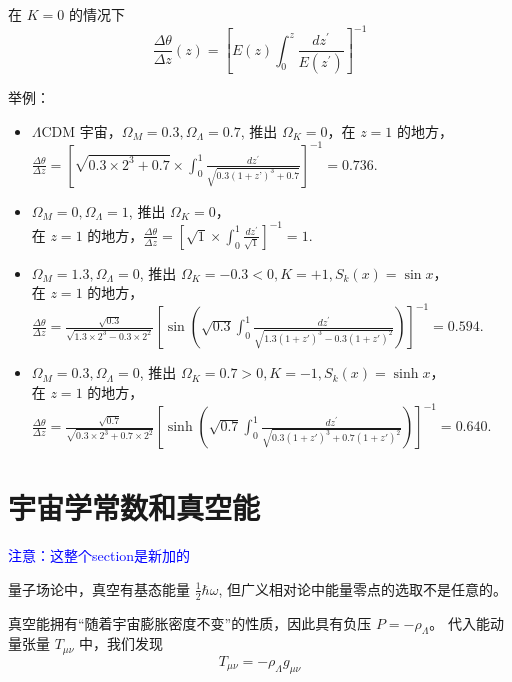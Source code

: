 \documentclass[12pt]{ctexart}
\newcommand{\new}[1]{\textcolor{blue}{#1}}
\begin{document}
在 $K=0$ 的情况下 
\begin{equation}
    \frac{\Delta \theta}{\Delta z}(z)= \left[E(z) \int_{0}^{z} \frac{d z^{\prime}}{E\left(z^{\prime}\right)}\right]^{-1}
\end{equation}

举例：
\begin{itemize}
    \item $\Lambda$CDM 宇宙，$\Omega_M=0.3,\Omega_\Lambda=0.7$, 推出 $\Omega_K=0$，在 $z=1$ 的地方，$\frac{\Delta \theta}{\Delta z}=\left[\sqrt{0.3 \times 2^{3}+0.7} \times \int_{0}^{1} \frac{d z^{\prime}}{\sqrt{0.3\left(1+z’\right)^{3}+0.7}}\right]^{-1}=0.736.$ 
    \item $\Omega_M=0, \Omega_\Lambda=1$, 推出 $\Omega_K=0$，\\ 在 $z=1$ 的地方，$\frac{\Delta \theta}{\Delta z}=\left[\sqrt{1} \times \int_{0}^{1} \frac{d z^{\prime}}{\sqrt{1}}\right]^{-1}=1.$ 
    \item $\Omega_M=1.3, \Omega_\Lambda=0$, 推出 $\Omega_K=-0.3<0, K=+1, S_k(x)=\sin x$，\\ 在 $z=1$ 的地方，\\$\frac{\Delta \theta}{\Delta z}=\frac{\sqrt{0.3}}{\sqrt{1.3\times 2^3-0.3\times 2^2}}\left[\sin(\sqrt{0.3}  \int_{0}^{1} \frac{d z^{\prime}}{\sqrt{1.3(1+z')^3 - 0.3 (1+z')^2}})\right]^{-1}=0.594.$  
    \item $\Omega_M=0.3, \Omega_\Lambda=0$, 推出 $\Omega_K=0.7>0, K=-1, S_k(x)=\sinh x$，\\ 在 $z=1$ 的地方，\\ $\frac{\Delta \theta}{\Delta z}=\frac{\sqrt{0.7}}{\sqrt{0.3\times 2^3 + 0.7\times 2^2}}\left[\sinh(\sqrt{0.7}  \int_{0}^{1} \frac{d z^{\prime}}{\sqrt{0.3(1+z')^3 + 0.7 (1+z')^2}})\right]^{-1}=0.640.$  
\end{itemize}


\section{宇宙学常数和真空能}

\new{注意：这整个section是新加的}

量子场论中，真空有基态能量 $\frac{1}{2}\hbar \omega$, 但广义相对论中能量零点的选取不是任意的。 

真空能拥有“随着宇宙膨胀密度不变”的性质，因此具有负压 $P=-\rho_\Lambda$。
代入能动量张量 $T_{\mu \nu}$ 中，我们发现 
\begin{equation}
    T_{\mu \nu} = - \rho_\Lambda
    g_{\mu \nu}
\end{equation}
\end{document}

